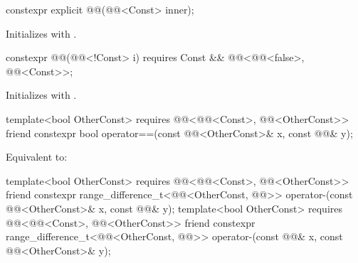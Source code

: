 %
\begin{itemdecl}
constexpr explicit @@(@@<Const> inner);
\end{itemdecl}

\begin{itemdescr}
\pnum
\effects
Initializes  with .
\end{itemdescr}

%
\begin{itemdecl}
constexpr @@(@@<!Const> i)
  requires Const && @@<@@<false>, @@<Const>>;
\end{itemdecl}

\begin{itemdescr}
\pnum
\effects
Initializes  with .
\end{itemdescr}

%
\begin{itemdecl}
template<bool OtherConst>
  requires @@<@@<Const>, @@<OtherConst>>
friend constexpr bool operator==(const @@<OtherConst>& x, const @@& y);
\end{itemdecl}

\begin{itemdescr}
\pnum
\effects
Equivalent to: 
\end{itemdescr}

%
\begin{itemdecl}
template<bool OtherConst>
  requires @@<@@<Const>, @@<OtherConst>>
friend constexpr range_difference_t<@@<OtherConst, @@>>
  operator-(const @@<OtherConst>& x, const @@& y);
template<bool OtherConst>
  requires @@<@@<Const>, @@<OtherConst>>
friend constexpr range_difference_t<@@<OtherConst, @@>>
  operator-(const @@& x, const @@<OtherConst>& y);
\end{itemdecl}

